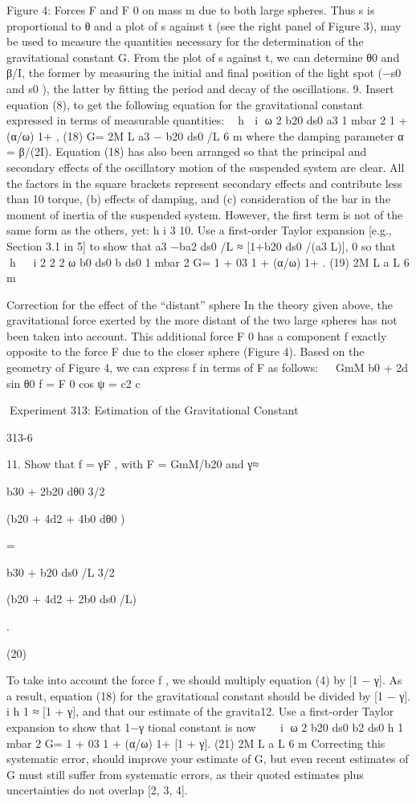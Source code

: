 \documentclass{beamer}
\begin{document}
\begin{frame}
Figure 4: Forces F and F 0 on mass m due to both large spheres.
Thus s is proportional to θ and a plot of s against t (see the right panel of Figure 3), may be used to measure
the quantities necessary for the determination of the gravitational constant G. From the plot of s against t,
we can determine θ0 and β/I, the former by measuring the initial and final position of the light spot (−s0
and s0 ), the latter by fitting the period and decay of the oscillations.
9. Insert equation (8), to get the following equation for the gravitational constant expressed in terms of
measurable quantities:

h

i
ω 2 b20 ds0
a3
1 mbar
2
1 + (α/ω)
1+
,
(18)
G=
2M L
a3 − b20 ds0 /L
6 m
where the damping parameter α = β/(2I).
Equation (18) has also been arranged so that the principal and secondary effects of the oscillatory motion
of the suspended system are clear. All the factors in the square brackets represent secondary effects and
contribute less than 10%
torque, (b) effects of damping, and (c) consideration of the bar in the moment of inertia of the suspended
system. However, the first term is not of the same form as the others, yet:
h
i
3
10. Use a first-order Taylor expansion [e.g., Section 3.1 in 5] to show that a3 −ba2 ds0 /L ≈ [1+b20 ds0 /(a3 L)],
0
so that

h


i
2 2
2
ω b0 ds0
b ds0
1 mbar
2
G=
1 + 03
1 + (α/ω)
1+
.
(19)
2M L
a L
6 m

Correction for the effect of the “distant” sphere
In the theory given above, the gravitational force exerted by the more distant of the two large spheres has
not been taken into account. This additional force F 0 has a component f exactly opposite to the force F
due to the closer sphere (Figure 4). Based on the geometry of Figure 4, we can express f in terms of F as
follows:


GmM b0 + 2d sin θ0
f = F 0 cos ψ =
c2
c

Experiment 313: Estimation of the Gravitational Constant

313-6

11. Show that f = γF , with F = GmM/b20 and
γ≈

b30 + 2b20 dθ0
3/2

(b20 + 4d2 + 4b0 dθ0 )

=

b30 + b20 ds0 /L
3/2

(b20 + 4d2 + 2b0 ds0 /L)

.

(20)

To take into account the force f , we should multiply equation (4) by [1 − γ]. As a result, equation (18) for
the gravitational constant should be divided by [1 − γ].
i
h
1
≈ [1 + γ], and that our estimate of the gravita12. Use a first-order Taylor expansion to show that 1−γ
tional constant is now



i
ω 2 b20 ds0
b2 ds0 h
1 mbar
2
G=
1 + 03
1 + (α/ω)
1+
[1 + γ].
(21)
2M L
a L
6 m
Correcting this systematic error, should improve your estimate of G, but even recent estimates of G must
still suffer from systematic errors, as their quoted estimates plus uncertainties do not overlap [2, 3, 4].


\end{frame}
\end{document}
